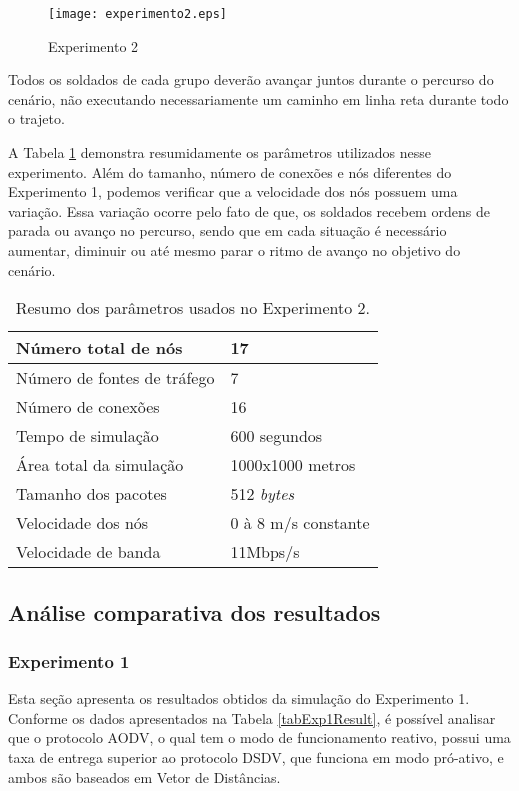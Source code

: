 \begin{figure}[H]
	\centering
	\texttt{[image: experimento2.eps]}
	\caption{Experimento 2}
	\label{figExp2}
\end{figure}

Todos os soldados de cada grupo dever\~ao avan\c{c}ar juntos durante o percurso do cen\'ario, n\~ao executando necessariamente um caminho em linha reta durante todo o trajeto.

A Tabela \ref{tabParamExp2} demonstra resumidamente os par\^ametros utilizados nesse experimento. 
Al\'em do tamanho, n\'umero de conex\~oes e n\'os diferentes do Experimento 1, podemos verificar que a velocidade dos n\'os possuem uma varia\c{c}\~ao.
Essa varia\c{c}\~ao ocorre pelo fato de que, os soldados recebem ordens de parada ou avan\c{c}o no percurso, sendo que em cada situa\c{c}\~ao \'e necess\'ario aumentar, diminuir ou at\'e mesmo parar o ritmo de avan\c{c}o no objetivo do cen\'ario.

\begin{table}[H]
	\centering
	\caption{Resumo dos par\^ametros usados no Experimento 2.}
	\begin{tabular}{ | l | l | }
		\hline
		N\'umero total de n\'os & 17 \\ \hline
		N\'umero de fontes de tr\'afego & 7 \\ \hline
		N\'umero de conex\~oes & 16 \\ \hline
		Tempo de simula\c{c}\~ao & 600 segundos \\ \hline
		\'Area total da simula\c{c}\~ao & 1000x1000 metros \\ \hline
		Tamanho dos pacotes & 512 \textit{bytes} \\ \hline
		Velocidade dos n\'os & 0 \`a 8 m/s constante \\ \hline
		Velocidade de banda & 11Mbps/s \\ \hline
	\end{tabular}
	\label{tabParamExp2}
\end{table}

\subsection{An\'alise comparativa dos resultados}

\subsubsection{Experimento 1}
Esta se\c{c}\~ao apresenta os resultados obtidos da simula\c{c}\~ao do Experimento 1.
Conforme os dados apresentados na Tabela \ref{tabExp1Result}, \'e poss\'ivel analisar que o protocolo AODV, o qual tem o modo de funcionamento reativo, possui uma taxa de entrega superior ao protocolo DSDV, que funciona em modo pr\'o-ativo, e ambos s\~ao baseados em Vetor de Dist\^ancias. 

